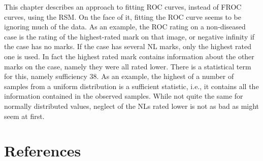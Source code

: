 \documentclass[
]{book}
\begin{document}
This chapter describes an approach to fitting ROC curves, instead of FROC curves, using the RSM. On the face of it, fitting the ROC curve seems to be ignoring much of the data. As an example, the ROC rating on a non-diseased case is the rating of the highest-rated mark on that image, or negative infinity if the case has no marks. If the case has several NL marks, only the highest rated one is used. In fact the highest rated mark contains information about the other marks on the case, namely they were all rated lower. There is a statistical term for this, namely sufficiency 38. As an example, the highest of a number of samples from a uniform distribution is a sufficient statistic, i.e., it contains all the information contained in the observed samples. While not quite the same for normally distributed values, neglect of the NLs rated lower is not as bad as might seem at first.

\hypertarget{froc-sample-size-references}{%
\section{References}\label{froc-sample-size-references}}

  
\end{document}
